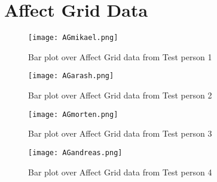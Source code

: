 \chapter{Affect Grid Data}\label{app:AG}
\begin{figure}[h]
\centering
\texttt{[image: AGmikael.png]}
\caption{Bar plot over Affect Grid data from Test person 1}
\label{fig:AGMikael}
\end{figure}

\begin{figure}[h]
\centering
\texttt{[image: AGarash.png]}
\caption{Bar plot over Affect Grid data from Test person 2}
\label{fig:AGArash}
\end{figure}

\begin{figure}[h]
\centering
\texttt{[image: AGmorten.png]}
\caption{Bar plot over Affect Grid data from Test person 3}
\label{fig:AGMorten}
\end{figure}

\begin{figure}[h]
\centering
\texttt{[image: AGandreas.png]}
\caption{Bar plot over Affect Grid data from Test person 4}
\label{fig:AGAndreas}
\end{figure}
